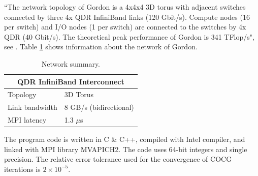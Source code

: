 \documentclass{wap}
\begin{document}
``The network topology of Gordon is a 4x4x4 3D torus with adjacent switches connected by three 4x QDR InfiniBand links (120 Gbit/s). Compute nodes (16 per switch) and I/O nodes (1 per switch) are connected to the switches by 4x QDR (40 Gbit/s). The theoretical peak performance of Gordon is 341 TFlop/s", see \cite{Gordon}. Table \ref{tab2} shows information about the network of Gordon.
\begin{table}[!hbp]
  \centering
  \caption{Network summary.}
    \begin{tabular}{rr}
    \toprule
    \multicolumn{2}{c}{QDR InfiniBand Interconnect} \\
    \midrule
    \multicolumn{1}{l}{Topology} & \multicolumn{1}{l}{3D Torus} \\
    \multicolumn{1}{l}{Link bandwidth} & \multicolumn{1}{l}{8 GB/s (bidirectional)} \\
    \multicolumn{1}{l}{MPI latency} & \multicolumn{1}{l}{1.3 $\mu$s} \\
    \bottomrule
    \end{tabular}%
  \label{tab2}%
\end{table}%

The program code is written in C \& C++, compiled with Intel compiler, and linked with MPI library MVAPICH2. The code uses 64-bit integers and single precision. The relative error tolerance used for the convergence of COCG iterations is $2\times 10^{-5}$.
\end{document}
